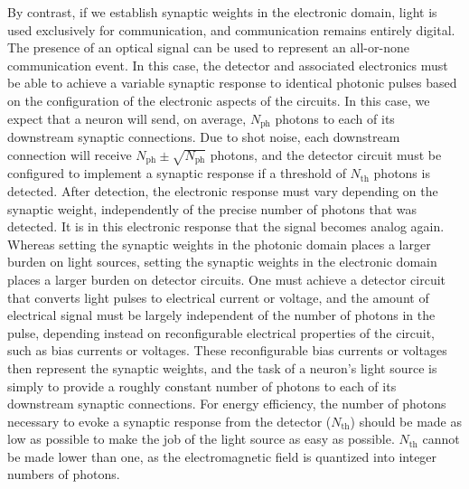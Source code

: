 \documentclass[twocolumn]{article}
\begin{document}
By contrast, if we establish synaptic weights in the electronic domain, light is used exclusively for communication, and communication remains entirely digital. The presence of an optical signal can be used to represent an all-or-none communication event. In this case, the detector and associated electronics must be able to achieve a variable synaptic response to identical photonic pulses based on the configuration of the electronic aspects of the circuits. In this case, we expect that a neuron will send, on average, $N_{\mathrm{ph}}$ photons to each of its downstream synaptic connections. Due to shot noise, each downstream connection will receive $N_{\mathrm{ph}}\pm\sqrt{N_{\mathrm{ph}}}$ photons, and the detector circuit must be configured to implement a synaptic response if a threshold of $N_{\mathrm{th}}$ photons is detected. After detection, the electronic response must vary depending on the synaptic weight, independently of the precise number of photons that was detected. It is in this electronic response that the signal becomes analog again. Whereas setting the synaptic weights in the photonic domain places a larger burden on light sources, setting the synaptic weights in the electronic domain places a larger burden on detector circuits. One must achieve a detector circuit that converts light pulses to electrical current or voltage, and the amount of electrical signal must be largely independent of the number of photons in the pulse, depending instead on reconfigurable electrical properties of the circuit, such as bias currents or voltages. These reconfigurable bias currents or voltages then represent the synaptic weights, and the task of a neuron's light source is simply to provide a roughly constant number of photons to each of its downstream synaptic connections. For energy efficiency, the number of photons necessary to evoke a synaptic response from the detector ($N_{\mathrm{th}}$) should be made as low as possible to make the job of the light source as easy as possible. $N_{\mathrm{th}}$ cannot be made lower than one, as the electromagnetic field is quantized into integer numbers of photons. 
\end{document}
